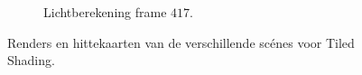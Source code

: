 \begin{figure}[t]
\begin{subfigure}[b]{0.35\textwidth}
    \caption{Lichtberekening frame $417$.}
    \label{fig:fds-test-frames-example:zc417lc}
  \end{subfigure}
  \caption{ Renders en hittekaarten van de verschillende sc\'enes voor Tiled Shading.}
  \label{fig:fds-test-frames-example:zc}
\end{figure}

